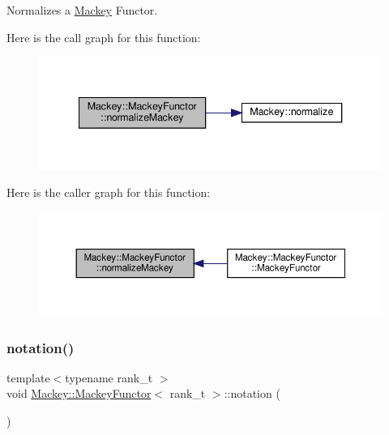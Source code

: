 Normalizes a \hyperlink{namespaceMackey}{Mackey} Functor. 

Here is the call graph for this function\+:\nopagebreak
\begin{figure}[H]
\begin{center}
\leavevmode
\includegraphics[width=340pt]{classMackey_1_1MackeyFunctor_a08150b3655fc27a7298d68b1857d830f_cgraph}
\end{center}
\end{figure}
Here is the caller graph for this function\+:\nopagebreak
\begin{figure}[H]
\begin{center}
\leavevmode
\includegraphics[width=350pt]{classMackey_1_1MackeyFunctor_a08150b3655fc27a7298d68b1857d830f_icgraph}
\end{center}
\end{figure}
\mbox{\label{classMackey_1_1MackeyFunctor_a2b333a786e44000c96ffd087a81a1d17}} 
\subsubsection{\texorpdfstring{notation()}{notation()}}
{\footnotesize\ttfamily template$<$typename rank\+\_\+t $>$ \\
void \hyperlink{classMackey_1_1MackeyFunctor}{Mackey\+::\+Mackey\+Functor}$<$ rank\+\_\+t $>$\+::notation (\begin{DoxyParamCaption}{ }\end{DoxyParamCaption})}



